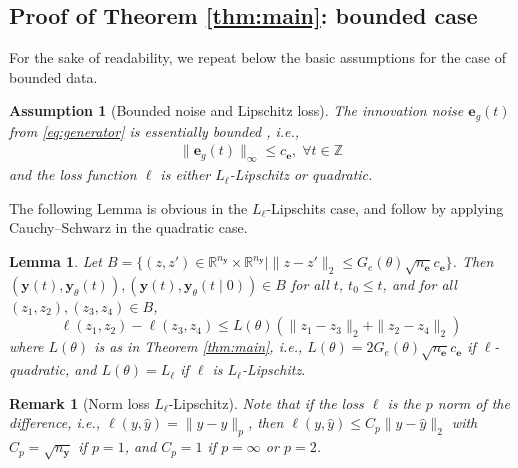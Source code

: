 \documentclass{article}
\def\rve{{\mathbf{e}}}
\def\rvy{{\mathbf{y}}}
\def\sZ{{\mathbb{Z}}}
\newtheorem{lemma}[theorem]{Lemma}
\newtheorem{assumption}[theorem]{Assumption}
\newtheorem{remark}[theorem]{Remark}
\newcommand{\y}{\mathbf{y}}
\begin{document}
\subsection{Proof of Theorem \ref{thm:main}: bounded case}
For the sake of readability, we repeat below the basic assumptions for the case of bounded data.
\begin{assumption}[Bounded noise and Lipschitz loss]\label{as:bounded}
    The innovation noise $\rve_g(t)$ from \eqref{eq:generator} is essentially bounded , i.e.,
    \begin{align}
        \|\rve_g(t)\|_\infty \leq c_\rve,\; \forall t\in\sZ
    \end{align}
and the loss function $\ell$ is either $L_{\ell}$-Lipschitz or quadratic.
\end{assumption}
The following Lemma is obvious in the $L_\ell$-Lipschits case, and follow by applying Cauchy–Schwarz in the quadratic case.
\begin{lemma}
  \label{lemma:bounded:quadratic_loss}
   Let $B=\{(z,z') \in \mathbb{R}^{n_\rvy} \times \mathbb{R}^{n_\rvy} \mid \|z-z'\|_2 \le G_e(\theta)\sqrt{n_{\rve}}c_{\rve}\}$. Then 
   $(\y(t), \y_{\theta}(t)), (\y(t),\y_{\theta}(t \mid 0)) \in B$ 
   for all $t$, $t_0 \le t$, and for all
   $(z_1,z_2),(z_3,z_4) \in B$, 
   \[ \ell(z_1,z_2)-\ell(z_3,z_4)\le L(\theta)\left(\|z_1-z_3\|_2 +\|z_2-z_4\|_2 \right) \]
   where $L(\theta)$ is as in Theorem \ref{thm:main}, i.e., $L(\theta)=2G_e(\theta)\sqrt{n_{\rve}}c_{\rve}$ if $\ell$-quadratic, and $L(\theta)=L_{\ell}$ if $\ell$ is $L_{\ell}$-Lipschitz.
\end{lemma}
\begin{remark}[Norm loss $L_{\ell}$-Lipschitz]
\label{rem:lipschitz2}
     Note that if the loss $\ell$ is the $p$ norm of the difference, i.e., $\ell(y,\hat{y})=\|y-\hat{y}\|_p$, then 
    $\ell(y,\hat{y})\leq C_p\|y-\hat{y}\|_2$ with $C_p=\sqrt{n_{\rvy}}$ if $p=1$, and $C_p=1$
     if $p=\infty$ or $p=2$.   
\end{remark}
\end{document}
